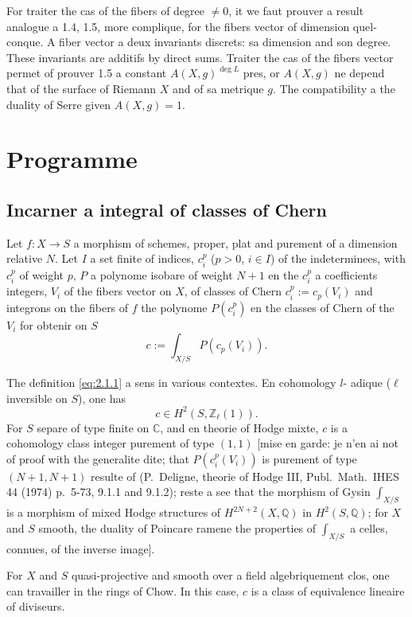 \documentclass[12pt,a4paper]{article}
\theoremstyle{plain}
\theoremstyle{definition}
\newcommand{\ZZ}{\mathbb{Z}}
\newcommand{\QQ}{\mathbb{Q}}
\newcommand{\CC}{\mathbb{C}}
\begin{document}
For traiter the cas of the fibers of degree $\neq 0$, it we faut prouver a result
analogue a 1.4, 1.5, more complique, for the fibers vector of dimension quel-
conque. A fiber vector a deux invariants discrets: sa dimension and son degree.
These invariants are additifs by direct sums. Traiter the cas of the fibers vector
permet of prouver 1.5 a constant $A(X,g)^{\deg L}$ pres, or $A(X,g)$ ne depend
that of the surface of Riemann $X$ and of sa metrique $g$. The compatibility a the
duality of Serre given $A(X,g) = 1$.



\section{Programme}

\subsection{Incarner a integral of classes of Chern}

Let $f: X \to S$ a morphism of schemes, proper, plat and purement of a
dimension relative $N$. Let $I$ a set finite of indices, $c_i^p$ ($p > 0$, $i \in I$)
of the indeterminees, with $c_i^p$ of weight $p$, $P$ a polynome isobare of weight $N+1$
en the $c_i^p$ a coefficients integers, $V_i$ of the fibers vector on $X$, of classes
of Chern $c_i^p := c_p(V_i)$ and integrons on the fibers of $f$ the polynome $P(c_i^p)$
en the classes of Chern of the $V_i$ for obtenir on $S$
\begin{equation}\label{eq:2.1.1}
c := \int_{X/S} P(c_p(V_i)) .
\end{equation}

The definition \eqref{eq:2.1.1} a sens in various contextes. En cohomology $l$-
adique ($\ell$ inversible on $S$), one has
\[
c \in H^2(S, \ZZ_\ell(1)) .
\]
For $S$ separe of type finite on $\CC$, and en theorie of Hodge mixte, $c$ is a
cohomology class integer purement of type $(1,1)$ [mise en garde: je n'en
ai not of proof with the generalite dite; that $P(c_i^p(V_i))$ is purement
of type $(N+1, N+1)$ resulte of (P.~Deligne, theorie of Hodge III, Publ.\ Math.\ IHES 44 (1974) p.~5-73, 9.1.1 and 9.1.2); reste a see that the morphism of
Gysin $\int_{X/S}$ is a morphism of mixed Hodge structures of $H^{2N+2}(X, \QQ)$
in $H^2(S, \QQ)$; for $X$ and $S$ smooth, the duality of Poincare ramene the properties
of $\int_{X/S}$ a celles, connues, of the inverse image].

For $X$ and $S$ quasi-projective and smooth over a field algebriquement clos,
one can travailler in the rings of Chow. In this case, $c$ is a class
of equivalence lineaire of diviseurs.
\end{document}
